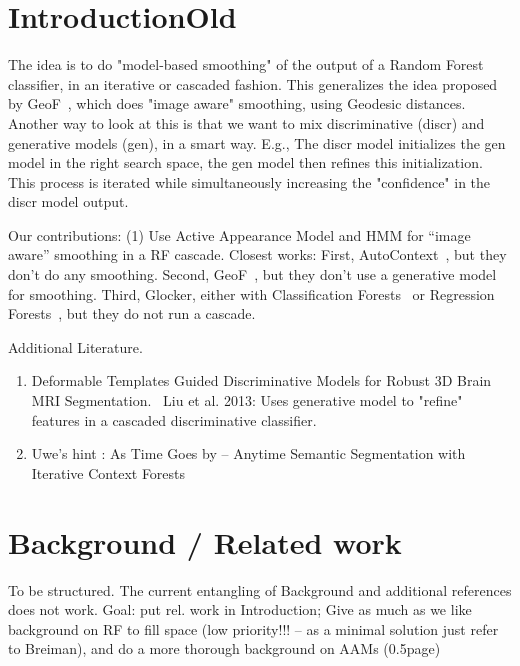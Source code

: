 \documentclass[10pt,twocolumn,letterpaper]{article}
\begin{document}
\section{IntroductionOld}
The idea is to do "model-based smoothing" of the output of a Random Forest classifier, in an iterative or cascaded fashion.  This generalizes the idea proposed by GeoF~\cite{GeoForests2013}, which does "image aware" smoothing, using Geodesic distances. 
%
Another way to look at this is that we want to mix discriminative (discr) and generative models (gen), in a smart way.  E.g., The discr model initializes the gen model in the right search space, the gen model then refines this initialization.  This process is iterated while simultaneously increasing the "confidence" in the discr model output. 

Our contributions: 
%
(1) Use Active Appearance Model and HMM for "`image aware"' smoothing in a RF cascade. 
Closest works: 
First, AutoContext~\cite{AutoContext2008}, but they don't do any smoothing. 
Second, GeoF~\cite{GeoForests2013}, but they don't use a generative model for smoothing. 
Third, Glocker, either with Classification Forests~\cite{Glocker2013} or Regression Forests~\cite{Glocker21012}, but they do not run a cascade. 
%

Additional Literature.
\begin{enumerate}
\item Deformable Templates Guided Discriminative Models for Robust 3D Brain MRI Segmentation.~\cite{BrainSeg2013}  Liu et al.  2013: Uses generative model to "refine" features in a cascaded discriminative classifier.
\item Uwe's hint \cite{Denzler2012}: As Time Goes by -- Anytime Semantic Segmentation with Iterative Context Forests
\end{enumerate}


\section{Background / Related work}

To be structured. The current entangling of Background and additional references does not work. 
Goal: put rel. work in Introduction; Give as much as we like background on RF to fill space (low priority!!! -- as a minimal solution just refer to Breiman), and do a more thorough background on AAMs (0.5page)
\end{document}
